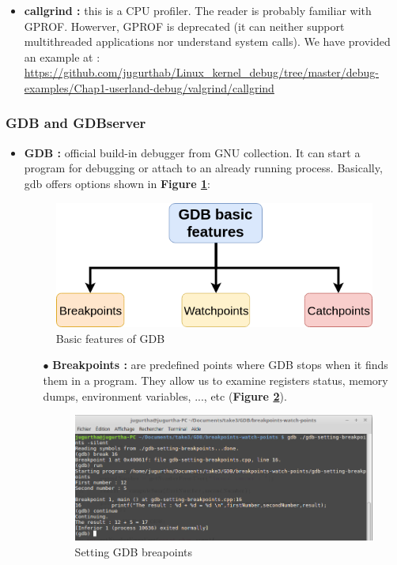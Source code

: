 \begin{itemize}
	\item \textbf{callgrind : } this is a CPU profiler. The reader is probably familiar with GPROF. Howerver, GPROF is deprecated (it can neither support multithreaded applications nor understand system calls).
We have provided an example at : {\color{blue}\url{https://github.com/jugurthab/Linux_kernel_debug/tree/master/debug-examples/Chap1-userland-debug/valgrind/callgrind}}


\end{itemize}

\subsubsection{GDB and GDBserver}


\begin{itemize}
	\item \textbf{GDB : } official build-in debugger from GNU collection. It can  start a program for debugging or attach to an already running process. Basically, gdb offers options shown in \textbf{Figure \ref{Basic features of GDB}}:
\begin{figure}[H]
		\centering
        \includegraphics[scale=0.40]{img/solution/basic-usage-gdb.png}
        \caption{Basic features of GDB}
        \label{Basic features of GDB}
    \end{figure}	
	
\begin{itemize}
\item[$\bullet$] \textbf{Breakpoints : } are predefined points where GDB stops when it finds them in a program. They allow us to examine registers status,
memory dumps, environment variables, ..., etc (\textbf{Figure \ref{Setting GDB breapoints}}).
\begin{figure}[H]
		\centering
        \includegraphics[scale=0.30]{img/solution/gdb-break-continue.png}
        \caption{Setting GDB breapoints}
        \label{Setting GDB breapoints}
    \end{figure}	




\end{itemize}
\end{itemize}
